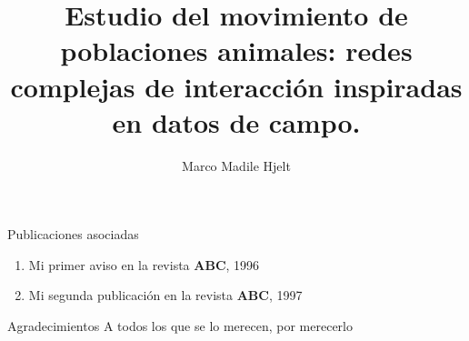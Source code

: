 \documentclass[12pt,screen,twoside,pagebackref]{ibtesis}
\title{Estudio del movimiento de poblaciones animales: redes complejas de interacción inspiradas en datos de campo.}
\author{Marco Madile Hjelt}
\begin{document}

\begin{preliminary}



\begin{abreviaturas}
\end{abreviaturas}

\tableofcontents                %

\listoffigures                  %

\listoftables                   %



\end{preliminary}







\appendix


\begin{biblio}

\end{biblio}


\begin{postliminary}

\begin{seccion}{Publicaciones asociadas}
  \begin{enumerate}
  \item Mi primer aviso en la revista \textbf{ABC}, 1996
  \item Mi segunda publicaci\'{o}n en la revista \textbf{ABC}, 1997
  \end{enumerate}
\end{seccion}

\begin{seccion}{Agradecimientos}
A todos los que se lo merecen, por merecerlo
\end{seccion}

\end{postliminary}
\end{document}
